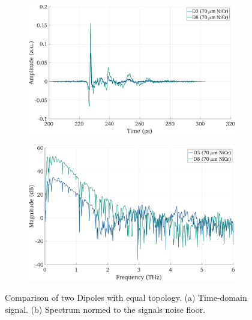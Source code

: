 \begin{figure}[h]
    \centering
    \begin{subfigure}[b]{0.485\textwidth}
        \centering
        \includegraphics[width=\textwidth]{figures/Results/D3_D8/D3_D8_time.pdf}
        \caption{}
    \end{subfigure}
    \hfill
    \begin{subfigure}[b]{0.485\textwidth}
        \centering
        \includegraphics[width=\textwidth]{figures/Results/D3_D8/D3_D8_spectrum_nn.pdf}
        \caption{}
    \end{subfigure}
    \caption{Comparison of two Dipoles with equal topology. (a) Time-domain signal. (b) Spectrum normed to the signals noise floor.}
\end{figure}

